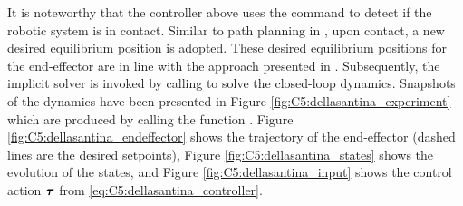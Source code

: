 
%
It is noteworthy that the controller above uses the command  to detect if the robotic system is in contact. Similar to path planning in \cite{DellaSantina2020Jan}, upon contact, a new desired equilibrium position is adopted. These desired equilibrium positions for the end-effector are in line with the approach presented in \cite{DellaSantina2020a}. Subsequently, the implicit solver is invoked by calling  to solve the closed-loop dynamics. Snapshots of the dynamics have been presented in Figure \ref{fig:C5:dellasantina_experiment} which are produced by calling the function . Figure \ref{fig:C5:dellasantina_endeffector} shows the trajectory of the end-effector (dashed lines are the desired setpoints), Figure \ref{fig:C5:dellasantina_states} shows the evolution of the states, and Figure \ref{fig:C5:dellasantina_input} shows the control action $\boldsymbol{\tau}$ from \eqref{eq:C5:dellasantina_controller}.
%
